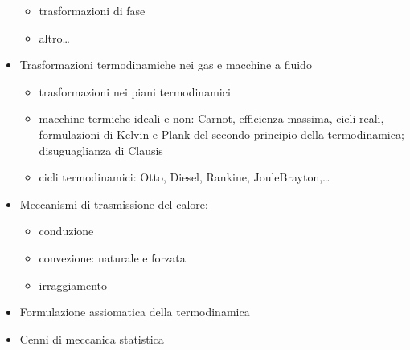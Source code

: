 \documentclass[letterpaper,10pt,english]{jupyterBook}
\begin{document}
\begin{itemize}
\begin{itemize}
\item {} 
\sphinxAtStartPar
trasformazioni di fase

\item {} 
\sphinxAtStartPar
altro…

\end{itemize}

\item {} 
\sphinxAtStartPar
Trasformazioni termodinamiche nei gas e macchine a fluido
\begin{itemize}
\item {} 
\sphinxAtStartPar
trasformazioni nei piani termodinamici

\item {} 
\sphinxAtStartPar
macchine termiche ideali e non: Carnot, efficienza massima, cicli reali, formulazioni di Kelvin e Plank del secondo principio della termodinamica; disuguaglianza di Clausis

\item {} 
\sphinxAtStartPar
cicli termodinamici: Otto, Diesel, Rankine, Joule\sphinxhyphen{}Brayton,…

\end{itemize}

\item {} 
\sphinxAtStartPar
Meccanismi di trasmissione del calore:
\begin{itemize}
\item {} 
\sphinxAtStartPar
conduzione

\item {} 
\sphinxAtStartPar
convezione: naturale e forzata

\item {} 
\sphinxAtStartPar
irraggiamento

\end{itemize}

\end{itemize}

\sphinxAtStartPar
{}
\begin{itemize}
\item {} 
\sphinxAtStartPar
Formulazione assiomatica della termodinamica

\item {} 
\sphinxAtStartPar
Cenni di meccanica statistica

\end{itemize}

\sphinxstepscope
\end{document}
